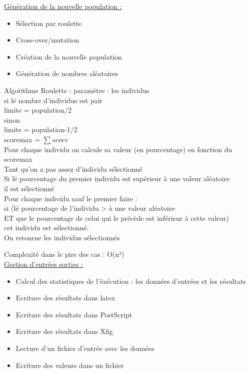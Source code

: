 \documentclass[a4paper,11pt]{article}
\begin{document}
		\underline{Génération de la nouvelle population : }
		\begin{itemize}
			\item Sélection par roulette
			\item Cross-over/mutation
			\item Création de la nouvelle population
			\item Génération de nombres aléatoires
		\end{itemize}
		\begin{tabbing} 
		Algo\=rithme Roulette : paramètre : les individus\\
			\>si l\=e nombre d’individus est pair\\
			\>	\>limite = population/2\\
			\>sinon\\
			\>	\>limite = population-1/2\\
			\>scoremax = $\sum score$\\
			\>Pour chaque individu on calcule sa valeur (en pourcentage) en fonction du scoremax\\
			\>Tant qu’on a pas assez d’individu sélectionné\\
			\>	\>Si l\=e pourcentage du premier individu est supérieur à une valeur aléatoire\\
			\>	\>\>il est sélectionné\\
			\>	\>Pour chaque individu sauf le premier faire :\\
			\>	\>\>si (l\=e pourcentage de l'individu > à une valeur aléatoire\\ 
			\>	\>\>ET que le pourcentage de celui qui le précède est inférieur à cette valeur)\\
			\>	\>\>\>cet individu est sélectionné.\\
			\>On retourne les individus sélectionnés
		\end{tabbing}
		Complexité dans le pire des cas : O(n²)\\
		
		\underline{Gestion d'entrées sorties : }
		\begin{itemize}
			\item Calcul des statistiques de l'éxécution : les données d'entrées et les résultats
			\item Ecriture des résultats dans latex
			\item Ecriture des résultats dans PostScript
			\item Ecriture des résultats dans Xfig
			\item Lecture d'un fichier d'entrée avec les données
			\item Ecriture des valeurs dans un fichier\\
		\end{itemize}
		
\end{document}

